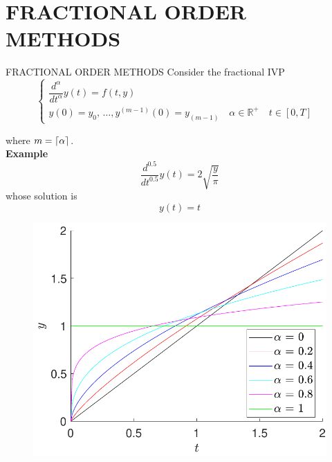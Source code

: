 \section{FRACTIONAL ORDER METHODS}
\begin{frame}{FRACTIONAL ORDER METHODS}
Consider the fractional IVP
\begin{equation}\label{eq:frac_dif}
     \begin{cases}
     \dfrac{d^ { \alpha }}{dt^{\alpha }}y(t) = f(t,y)&\\ y(0)=y_0,\,\dots,y^{(m-1)}(0)= y_{(m-1)}\quad \alpha \in \mathbb{R}^+\quad t\in[0,T]&
     \end{cases}
\end{equation}
\begin{multicols}{2}
where $m=\lceil\alpha\rceil$. \\[0.4cm]\textbf{Example}
\begin{equation}
    \dfrac{d^{0.5}}{dt^{0.5}} y(t)=2\sqrt{\dfrac{y}{\pi}}
\end{equation}
whose solution is \begin{equation}
    y(t)=t
\end{equation}
\columnbreak
\begin{figure}
    \centering
    \includegraphics[scale=0.4]{files/t_derivative.pdf}
\end{figure}
\end{multicols}
\end{frame}


